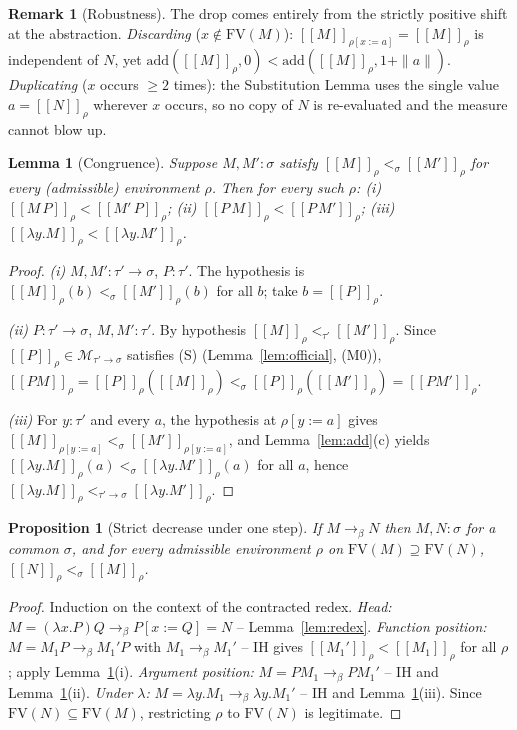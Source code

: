 \documentclass{amsart}
\newtheorem{lemma}{Lemma}
\newtheorem{proposition}{Proposition}
\theoremstyle{definition}
\newtheorem{remark}{Remark}
\newcommand{\interp}[1]{[\![#1]\!]}
\newcommand{\To}{\to_\beta}
\newcommand{\FV}{\mathrm{FV}}
\begin{document}
\begin{remark}[Robustness]
The drop comes entirely from the strictly positive shift at the abstraction.
\emph{Discarding} ($x\notin\FV(M)$): $\interp{M}_{\rho[x:=a]}=\interp{M}_\rho$ is independent
of $N$, yet $\mathrm{add}(\interp M_\rho,0)<\mathrm{add}(\interp M_\rho,1{+}\|a\|)$.
\emph{Duplicating} ($x$ occurs $\ge2$ times): the Substitution Lemma uses the single value
$a=\interp N_\rho$ wherever $x$ occurs, so no copy of $N$ is re-evaluated and the measure
cannot blow up.
\end{remark}

\begin{lemma}[Congruence]\label{lem:cong}
Suppose $M,M':\sigma$ satisfy $\interp{M}_\rho<_\sigma\interp{M'}_\rho$ for every
\emph{(}admissible\emph{)} environment $\rho$. Then for every such $\rho$:
\textup{(i)} $\interp{M\,P}_\rho<\interp{M'\,P}_\rho$;
\textup{(ii)} $\interp{P\,M}_\rho<\interp{P\,M'}_\rho$;
\textup{(iii)} $\interp{\lambda y.M}_\rho<\interp{\lambda y.M'}_\rho$.
\end{lemma}

\begin{proof}
\emph{(i)} $M,M':\tau'\to\sigma$, $P:\tau'$. The hypothesis is
$\interp{M}_\rho(b)<_\sigma\interp{M'}_\rho(b)$ for all $b$; take $b=\interp P_\rho$.

\emph{(ii)} $P:\tau'\to\sigma$, $M,M':\tau'$. By hypothesis
$\interp{M}_\rho<_{\tau'}\interp{M'}_\rho$. Since $\interp P_\rho\in\mathcal M_{\tau'\to\sigma}$
satisfies (S) (Lemma~\ref{lem:official}, (M0)),
$\interp{PM}_\rho=\interp P_\rho(\interp M_\rho)<_\sigma\interp P_\rho(\interp{M'}_\rho)=\interp{PM'}_\rho$.

\emph{(iii)} For $y:\tau'$ and every $a$, the hypothesis at $\rho[y:=a]$ gives
$\interp{M}_{\rho[y:=a]}<_\sigma\interp{M'}_{\rho[y:=a]}$, and Lemma~\ref{lem:add}(c) yields
$\interp{\lambda y.M}_\rho(a)<_\sigma\interp{\lambda y.M'}_\rho(a)$ for all $a$, hence
$\interp{\lambda y.M}_\rho<_{\tau'\to\sigma}\interp{\lambda y.M'}_\rho$.
\end{proof}

\begin{proposition}[Strict decrease under one step]\label{prop:step}
If $M\To N$ then $M,N:\sigma$ for a common $\sigma$, and for every admissible environment
$\rho$ on $\FV(M)\supseteq\FV(N)$, $\interp{N}_\rho<_\sigma\interp{M}_\rho$.
\end{proposition}

\begin{proof}
Induction on the context of the contracted redex.
\emph{Head:} $M=(\lambda x.P)Q\To P[x:=Q]=N$ -- Lemma~\ref{lem:redex}.
\emph{Function position:} $M=M_1P\To M_1'P$ with $M_1\To M_1'$ -- IH gives
$\interp{M_1'}_\rho<\interp{M_1}_\rho$ for all $\rho$; apply Lemma~\ref{lem:cong}(i).
\emph{Argument position:} $M=PM_1\To PM_1'$ -- IH and Lemma~\ref{lem:cong}(ii).
\emph{Under $\lambda$:} $M=\lambda y.M_1\To\lambda y.M_1'$ -- IH and
Lemma~\ref{lem:cong}(iii). Since $\FV(N)\subseteq\FV(M)$, restricting $\rho$ to $\FV(N)$ is
legitimate.
\end{proof}
\end{document}

